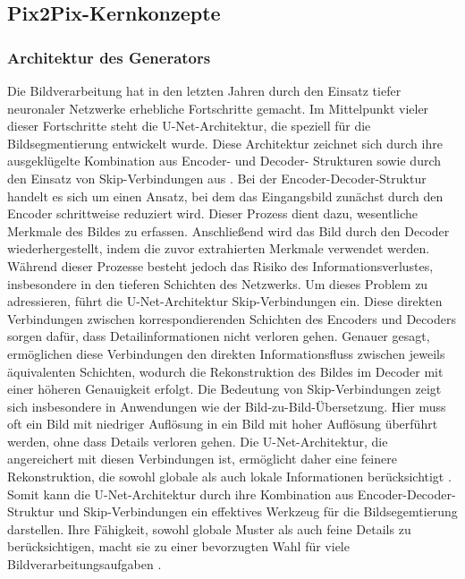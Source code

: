 \subsection{Pix2Pix-Kernkonzepte}
\subsubsection{Architektur des Generators}
Die Bildverarbeitung hat in den letzten Jahren durch den Einsatz tiefer neuronaler Netzwerke erhebliche Fortschritte gemacht. Im Mittelpunkt vieler dieser Fortschritte steht die U-Net-Architektur, die speziell für die Bildsegmentierung entwickelt wurde. Diese Architektur zeichnet sich durch ihre ausgeklügelte Kombination aus Encoder- und Decoder- Strukturen sowie durch den Einsatz von Skip-Verbindungen aus \cite{PhillipIsola.}. 
 \newline
Bei der Encoder-Decoder-Struktur handelt es sich um einen Ansatz, bei dem das Eingangsbild zunächst durch den Encoder schrittweise reduziert wird. Dieser Prozess dient dazu, wesentliche Merkmale des Bildes zu erfassen. Anschließend wird das Bild durch den Decoder wiederhergestellt, indem die zuvor extrahierten Merkmale verwendet werden. Während dieser Prozesse besteht jedoch das Risiko des Informationsverlustes, insbesondere in den tieferen Schichten des Netzwerks.
Um dieses Problem zu adressieren, führt die U-Net-Architektur Skip-Verbindungen ein. Diese direkten Verbindungen zwischen korrespondierenden Schichten des Encoders und Decoders sorgen dafür, dass Detailinformationen nicht verloren gehen. Genauer gesagt, ermöglichen diese Verbindungen den direkten Informationsfluss zwischen jeweils äquivalenten Schichten, wodurch die Rekonstruktion des Bildes im Decoder mit einer höheren Genauigkeit erfolgt\cite{PhillipIsola.}. \newline
Die Bedeutung von Skip-Verbindungen zeigt sich insbesondere in Anwendungen wie der Bild-zu-Bild-Übersetzung. Hier muss oft ein Bild mit niedriger Auflösung in ein Bild mit hoher Auflösung überführt werden, ohne dass Details verloren gehen. Die U-Net-Architektur, die angereichert mit diesen Verbindungen ist, ermöglicht daher eine feinere Rekonstruktion, die sowohl globale als auch lokale Informationen berücksichtigt \cite{PhillipIsola.}.  \newline
Somit kann die U-Net-Architektur durch ihre Kombination aus Encoder-Decoder-Struktur und Skip-Verbindungen ein effektives Werkzeug für die Bildsegemtierung darstellen. Ihre Fähigkeit, sowohl globale Muster als auch feine Details zu berücksichtigen, macht sie zu einer bevorzugten Wahl für viele Bildverarbeitungsaufgaben \cite{PhillipIsola.}. \newline
